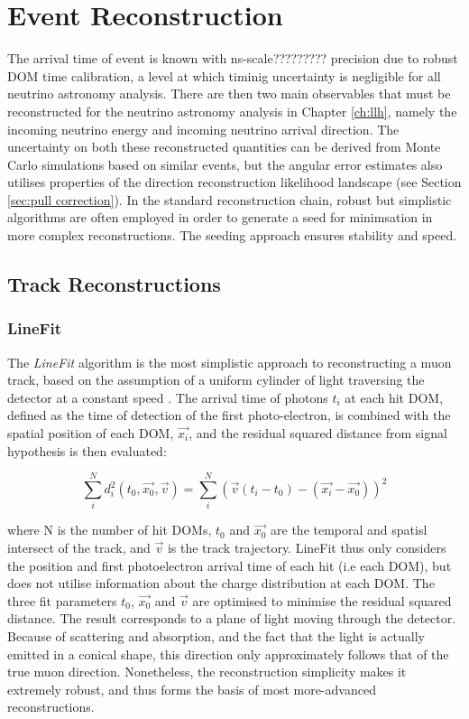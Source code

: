 \section{Event Reconstruction}
\label{sec:reco}

The arrival time of event is known with ns-scale????????? precision due to robust DOM time calibration, a level at which timinig uncertainty is negligible for all neutrino astronomy analysis. There are then two main observables that must be reconstructed for the neutrino astronomy analysis in Chapter \ref{ch:llh}, namely the incoming neutrino energy and incoming neutrino arrival direction. The uncertainty on both these reconstructed quantities can be derived from Monte Carlo simulations based on similar events, but the angular error estimates also utilises properties of the direction reconstruction likelihood landscape (see Section \ref{sec:pull correction}). In the standard reconstruction chain, robust but simplistic algorithms are often employed in order to generate a seed for minimsation in more complex reconstructions. The seeding approach ensures stability and speed. 

\subsection{Track Reconstructions}

\subsubsection*{LineFit}
The \emph{LineFit} algorithm is the most simplistic approach to reconstructing a muon track, based on the assumption of a uniform cylinder of light traversing the detector at a constant speed . The arrival time of photons $t_{i}$ at each hit DOM, defined as the time of detection of the first photo-electron, is combined with the spatial position of each DOM, $\vec{x_{i}}$, and the residual squared distance from signal hypothesis is then evaluated:

\begin{equation}
	\sum^{N}_{i} d_{i}^{2}(t_{0}, \vec{x_{0}}, \vec{v})= \sum^{N}_{i}  \left( \vec{v}(t_{i} - t_{0}) - (\vec{x_{i}} - \vec{x_{0}}) \right)^{2}
\end{equation} 

where N is the number of hit DOMs, $t_{0}$ and $\vec{x_{0}}$ are the temporal and spatisl intersect of the track, and $\vec{v}$ is the track trajectory. LineFit thus only considers the position and first photoelectron arrival time of each hit (i.e each DOM), but does not utilise information about the charge distribution at each DOM. The three fit parameters $t_{0}$, $\vec{x_{0}}$ and $\vec{v}$ are optimised to minimise the residual squared distance. The result corresponds to a plane of light moving through the detector. Because of scattering and absorption, and the fact that the light is actually emitted in a conical shape, this direction only approximately follows that of the true muon direction. Nonetheless, the reconstruction simplicity makes it extremely robust, and thus forms the basis of most more-advanced reconstructions. 

